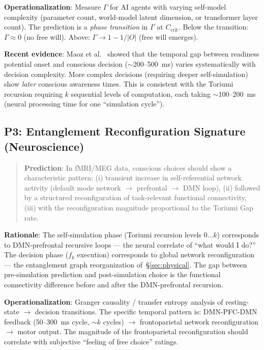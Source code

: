 \documentclass[12pt,a4paper]{article}
\theoremstyle{definition}
\theoremstyle{remark}
\begin{document}
\textbf{Operationalization}: Measure $\Gamma$ for AI agents with varying
self-model complexity (parameter count, world-model latent dimension, or
transformer layer count). The prediction is a \emph{phase transition} in
$\Gamma$ at $C_{\text{crit}}$. Below the transition: $\Gamma \approx 0$
(no free will). Above: $\Gamma \to 1 - 1/|O|$ (free will emerges).

\textbf{Recent evidence}: Maoz et al.\ \cite{maoz2019} showed that the
temporal gap between readiness potential onset and conscious decision
($\sim$200--500~ms) varies systematically with decision complexity.
More complex decisions (requiring deeper self-simulation) show \emph{later}
conscious awareness times. This is consistent with the Toriumi recursion
requiring $k$ sequential levels of computation, each taking $\sim$100--200~ms
(neural processing time for one ``simulation cycle'').

\subsection{P3: Entanglement Reconfiguration Signature (Neuroscience)}

\begin{quote}
\textbf{Prediction}: In fMRI/MEG data, conscious choices should show a
characteristic pattern: (i) transient increase in self-referential network
activity (default mode network $\to$ prefrontal $\to$ DMN loop),
(ii) followed by a structured reconfiguration of task-relevant functional
connectivity, (iii) with the reconfiguration magnitude proportional to
the Toriumi Gap rate.
\end{quote}

\textbf{Rationale}: The self-simulation phase (Toriumi recursion levels
$0 \ldots k$) corresponds to DMN-prefrontal recursive loops --- the neural
correlate of ``what would I do?'' The decision phase ($f_k$ execution)
corresponds to global network reconfiguration --- the entanglement graph
reorganization of~\S\ref{sec:physical}. The gap between pre-simulation
prediction and post-simulation choice is the functional connectivity
difference before and after the DMN-prefrontal recursion.

\textbf{Operationalization}: Granger causality / transfer entropy analysis of
resting-state $\to$ decision transitions. The specific temporal pattern is:
DMN-PFC-DMN feedback (50--300~ms cycle, $\sim k$ cycles) $\to$
frontoparietal network reconfiguration $\to$ motor output. The magnitude of
the frontoparietal reconfiguration should correlate with subjective ``feeling
of free choice'' ratings.
\end{document}
